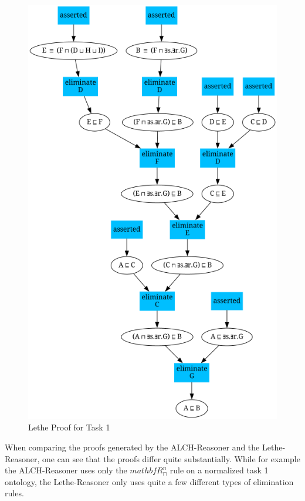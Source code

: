 \documentclass[titlepage]{article}
\begin{document}
\begin{figure}
  \centering
  \includegraphics[width=1\textwidth]{pictures/Lethe_task00001.png}
  \caption{Lethe Proof for Task 1}
  \label{fig:label}
\end{figure}

When comparing the proofs generated by the ALCH-Reasoner and the Lethe-Reasoner, one can see that the 
proofs differ quite substantially. While for example the ALCH-Reasoner uses only the $mathbf{R^{n}_{\sqcap}}$ rule
on a normalized task 1 ontology, the Lethe-Reasoner only uses quite a few different types of elimination rules. 
\end{document}
